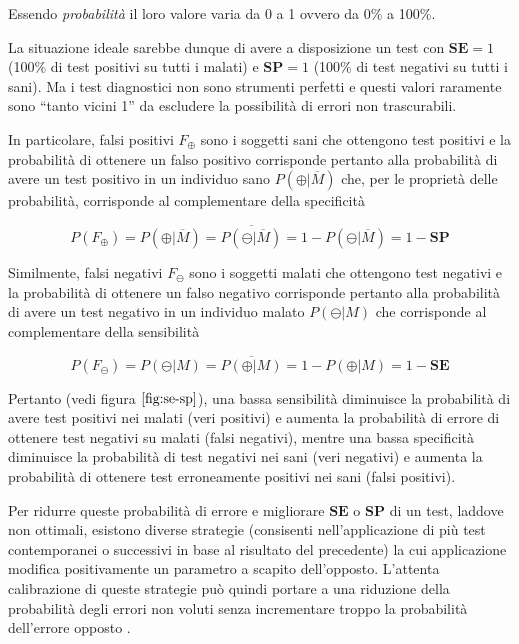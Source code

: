 \documentclass[11pt]{article}
\begin{document}
Essendo \emph{probabilità} il loro valore varia da 0 a 1 ovvero da 0\% a
100\%.

La situazione ideale sarebbe dunque di avere a disposizione un test con
\(\mathbf{SE}=1\) (100\% di test positivi su tutti i malati) e
\(\mathbf{SP}=1\) (100\% di test negativi su tutti i sani). Ma i test
diagnostici non sono strumenti perfetti e questi valori raramente sono
``tanto vicini 1'' da escludere la possibilità di errori non
trascurabili.

In particolare, falsi positivi \(F_{\oplus}\) sono i soggetti sani che
ottengono test positivi e la probabilità di ottenere un falso positivo
corrisponde pertanto alla probabilità di avere un test positivo in un
individuo sano \(P(\oplus|\overline{M})\) che, per le proprietà delle
probabilità, corrisponde al complementare della specificità

\begin{equation}\label{eq:falsipositivi}
P(F_{\oplus}) = P(\oplus|\overline{M}) = \overline{P(\ominus|\overline{M})} = 1 - P(\ominus|\overline{M}) =
1 - \mathbf{SP}
\end{equation}

Similmente, falsi negativi \(F_{\ominus}\) sono i soggetti malati che
ottengono test negativi e la probabilità di ottenere un falso negativo
corrisponde pertanto alla probabilità di avere un test negativo in un
individuo malato \(P(\ominus|M)\) che corrisponde al complementare della
sensibilità

\begin{equation}\label{eq:falsinegativi}
P(F_{\ominus}) = P(\ominus|M) = \overline{P(\oplus|M)} = 1 - P(\oplus|M) =
1 - \mathbf{SE}
\end{equation}

Pertanto (vedi figura \(\ref{fig:se-sp}\)), una bassa sensibilità
diminuisce la probabilità di avere test positivi nei malati (veri
positivi) e aumenta la probabilità di errore di ottenere test negativi
su malati (falsi negativi), mentre una bassa specificità diminuisce la
probabilità di test negativi nei sani (veri negativi) e aumenta la
probabilità di ottenere test erroneamente positivi nei sani (falsi
positivi).

Per ridurre queste probabilità di errore e migliorare \(\mathbf{SE}\) o
\(\mathbf{SP}\) di un test, laddove non ottimali, esistono diverse
strategie (consisenti nell'applicazione di più test contemporanei o
successivi in base al risultato del precedente) la cui applicazione
modifica positivamente un parametro a scapito dell'opposto. L'attenta
calibrazione di queste strategie può quindi portare a una riduzione
della probabilità degli errori non voluti senza incrementare troppo la
probabilità dell'errore opposto \cite{weinstein2005clinical}.
\end{document}

